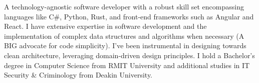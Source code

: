 \par{
A technology-agnostic software developer with a robust skill set encompassing languages like C\#, Python, Rust, and front-end frameworks such as Angular and React. I have extensive expertise in software development and the implementation of complex data structures and algorithms when necessary (A BIG advocate for code simplicity). I've been instrumental in designing towards clean architecture, leveraging domain-driven design principles. I hold a Bachelor's degree in Computer Science from RMIT University and additional studies in IT Security \& Criminology from Deakin University.
}
